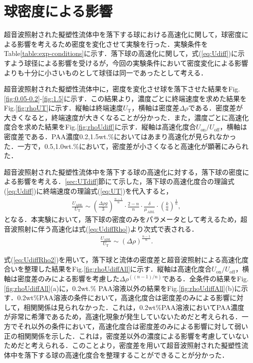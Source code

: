 \section{球密度による影響}
\label{sec:density}
超音波照射された擬塑性流体中を落下する球における高速化に関して，球密度による影響を考えるため密度を変化させて実験を行った．実験条件をTable\ref{table:exp-conditions}に示す．落下球の高速化に関して，式(\ref{eq:Udiff})に示すよう球径による影響を受けるが，今回の実験条件において密度変化による影響よりも十分に小さいものとして球径は同一であったとして考える．

超音波照射された擬塑性流体中に，密度を変化させ球を落下させた結果をFig.\ref{fig:0.05-0.2}-\ref{fig:1.5}に示す．この結果より，濃度ごとに終端速度を求めた結果をFig.\ref{fig:rhoUT}に示す．縦軸は終端速度$U_\text{T}$，横軸は密度差$\Delta\rho$である．密度差が大きくなると，終端速度が大きくなることが分かった．また，濃度ごとに高速化度合を求めた結果をFig.\ref{fig:rhoUdiff}に示す．縦軸は高速化度合$U_\text{on}/U_\text{off}$，横軸は密度差である．PAA濃度0.2,1.5wt.\%においてはあまり高速化が見られなかった．一方で，0.5,1.0wt.\%において，密度差が小さくなると高速化が顕著にみられた．

超音波照射された擬塑性流体中を落下する球の高速化に対する，落下球の密度による影響を考える．\ref{sec:UTdiff}節にて示した，落下球の高速化度合の理論式(\ref{eq:Udiff})に終端速度の理論式(\ref{eq:UT})を代入すると，
\begin{eqnarray}
    \frac{U_\text{ABL}}{U_\text{T}} \sim \left(\frac{\Delta\rho{}g}{3}\right)^{\frac{n-1}{n}}\cdot\frac{2-n}{n}\cdot\frac{\delta}{\mu_{ABL}}\cdot\left(\frac{k}{a}\right)^{\frac{1}{n}} ,
    \label{eq:UdiffRho}
\end{eqnarray}
となる．本実験において，落下球の密度のみをパラメータとして考えるため，超音波照射に伴う高速化は式(\ref{eq:UdiffRho})より次式で表される．
\begin{eqnarray}
    \frac{U_\text{ABL}}{U_\text{T}} \sim \left(\Delta\rho{}\right)^{\frac{n-1}{n}} .
    \label{eq:UdiffRho2}
\end{eqnarray}

式(\ref{eq:UdiffRho2})を用いて，落下球と流体の密度差と超音波照射による高速化度合いを整理した結果をFig.\ref{fig:rhoUdiffAll}に示す．縦軸は高速化度合$U_\text{on}/U_\text{off}$，横軸は密度差のみによる影響を考慮した$\Delta\rho^{\left(\left(n-1\right)/n\right)}$である．全条件の結果をFig.\ref{fig:rhoUdiffAll}(a)に，0.2wt.\% PAA溶液以外の結果をFig.\ref{fig:rhoUdiffAll}(b)に示す．0.2wt\%PAA溶液の条件において，高速化度合は密度差のみによる影響に対して，相関関係は見られなかった．これは，0.2wt\%PAA溶液においてPAA濃度が非常に希薄であるため，高速化現象が発生していないためだと考えられる．一方でそれ以外の条件において，高速化度合は密度差のみによる影響に対して弱い正の相関関係を示した．これは，密度差以外の濃度による影響を考慮していないためだと考えられる．このことより，密度差を用いて超音波照射された擬塑性流体中を落下する球の高速化度合を整理することができることが分かった．

